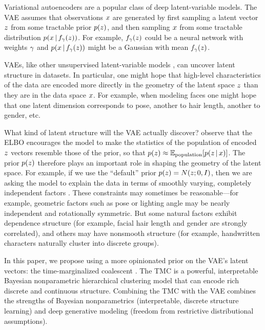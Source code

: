 Variational autoencoders \citep[VAEs; ][]{Kingma2013,Rezende2014} are a popular class of deep latent-variable models. The VAE assumes that observations $x$ are generated by first sampling a latent vector $z$ from some tractable prior $p(z)$, and then sampling $x$ from some tractable distribution $p(x \,|\, f_\gamma(z))$.
For example, $f_\gamma(z)$ could be a neural network with weights $\gamma$ and $p(x \,|\, f_\gamma(z))$ might be a Gaussian with mean $f_\gamma(z)$.

VAEs, like other unsupervised latent-variable models \citep[e.g.; ][]{Tipping1999,Blei2003}, can uncover latent structure in datasets.
In particular, one might hope that high-level characteristics of the data are encoded more directly in the geometry of the latent space $z$ than they are in the data space $x$. For example, when modeling faces one might hope that one latent dimension corresponds to pose, another to hair length, another to gender, etc. 

What kind of latent structure will the VAE actually discover?
\citet{Hoffman2016} observe that the ELBO encourages the model to make the statistics of the population of encoded $z$ vectors resemble those of the prior, so that $p(z)\approx \mathbb{E}_\mathrm{population}[p(z \,|\, x)]$.
The prior $p(z)$ therefore plays an important role in shaping the geometry of the latent space.
For example, if we use the ``default'' prior $p(z)=N(z; 0, I)$, then we are asking the model to explain the data in terms of smoothly varying, completely independent factors \citep{Burgess2018}. These constraints may sometimes be reasonable---for example, geometric factors such as pose or lighting angle may be nearly independent and rotationally symmetric. But some natural factors exhibit dependence structure (for example, facial hair length and gender are strongly correlated), and others may have nonsmooth structure (for example, handwritten characters naturally cluster into discrete groups).

In this paper, we propose using a more opinionated prior on the VAE's latent vectors: the time-marginalized coalescent \citep[TMC; ][]{Boyles2012}.
The TMC is a powerful, interpretable Bayesian nonparametric hierarchical clustering model that can encode rich discrete and continuous structure.
Combining the TMC with the VAE combines the strengths of Bayesian nonparametrics (interpretable, discrete structure learning) and deep generative modeling (freedom from restrictive distributional assumptions).


